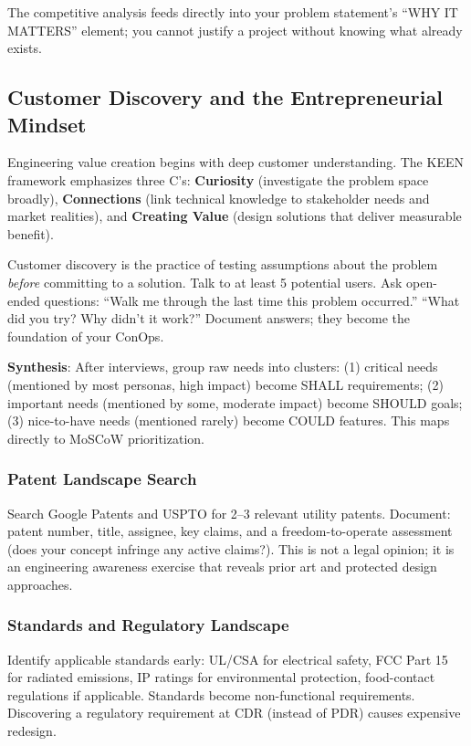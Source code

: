 \documentclass[11pt,letterpaper,twoside,openany]{book}
\begin{document}
The competitive analysis feeds directly into your problem statement's ``WHY IT MATTERS'' element; you cannot justify a project without knowing what already exists.

\subsection{Customer Discovery and the Entrepreneurial Mindset}
Engineering value creation begins with deep customer understanding. The KEEN framework emphasizes three C's: \textbf{Curiosity} (investigate the problem space broadly), \textbf{Connections} (link technical knowledge to stakeholder needs and market realities), and \textbf{Creating Value} (design solutions that deliver measurable benefit).

Customer discovery is the practice of testing assumptions about the problem \emph{before} committing to a solution. Talk to at least 5 potential users. Ask open-ended questions: ``Walk me through the last time this problem occurred.'' ``What did you try? Why didn't it work?'' Document answers; they become the foundation of your ConOps.

\textbf{Synthesis}: After interviews, group raw needs into clusters: (1) critical needs (mentioned by most personas, high impact) become SHALL requirements; (2) important needs (mentioned by some, moderate impact) become SHOULD goals; (3) nice-to-have needs (mentioned rarely) become COULD features. This maps directly to MoSCoW prioritization.


\subsubsection{Patent Landscape Search}
Search Google Patents and USPTO for 2--3 relevant utility patents. Document: patent number, title, assignee, key claims, and a freedom-to-operate assessment (does your concept infringe any active claims?). This is not a legal opinion; it is an engineering awareness exercise that reveals prior art and protected design approaches.

\subsubsection{Standards and Regulatory Landscape}
Identify applicable standards early: UL/CSA for electrical safety, FCC Part 15 for radiated emissions, IP ratings for environmental protection, food-contact regulations if applicable. Standards become non-functional requirements. Discovering a regulatory requirement at CDR (instead of PDR) causes expensive redesign.
\end{document}
